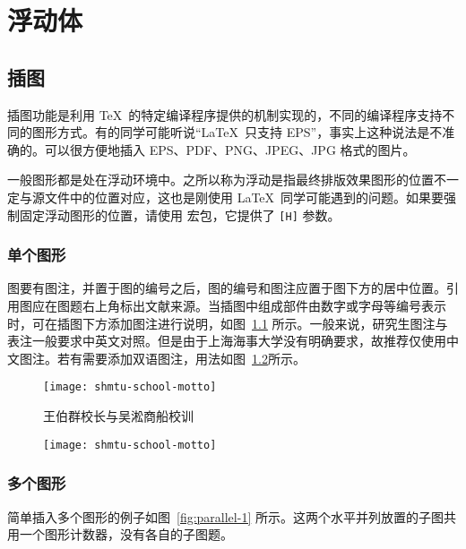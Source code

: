 \chapter{浮动体}

\section{插图}

插图功能是利用 \TeX\ 的特定编译程序提供的机制实现的，不同的编译程序支持不同的图形方式。有的同学可能听说“\LaTeX\ 只支持 EPS”，事实上这种说法是不准确的。\XeTeX 可以很方便地插入 EPS、PDF、PNG、JPEG、JPG 格式的图片。

一般图形都是处在浮动环境中。之所以称为浮动是指最终排版效果图形的位置不一定与源文件中的位置对应，这也是刚使用 \LaTeX\ 同学可能遇到的问题。如果要强制固定浮动图形的位置，请使用  宏包，它提供了 \texttt{[H]} 参数。

\subsection{单个图形}

图要有图注，并置于图的编号之后，图的编号和图注应置于图下方的居中位置。引用图应在图题右上角标出文献来源。当插图中组成部件由数字或字母等编号表示时，可在插图下方添加图注进行说明，如图~\ref{fig:shmtu-school-motto} 所示。一般来说，研究生图注与表注一般要求中英文对照。但是由于上海海事大学没有明确要求，故推荐仅使用中文图注。若有需要添加双语图注，用法如图~\ref{fig:shmtu-school-motto-2}所示。

\begin{figure}[!htp]
    \centering
    \texttt{[image: shmtu-school-motto]}
    \caption{王伯群校长与吴淞商船校训}
    \label{fig:shmtu-school-motto}
\end{figure}

\begin{figure}[!htp]
    \centering
    \texttt{[image: shmtu-school-motto]}
    \label{fig:shmtu-school-motto-2}
\end{figure}

\subsection{多个图形}

简单插入多个图形的例子如图~\ref{fig:parallel-1} 所示。这两个水平并列放置的子图共用一个图形计数器，没有各自的子图题。

